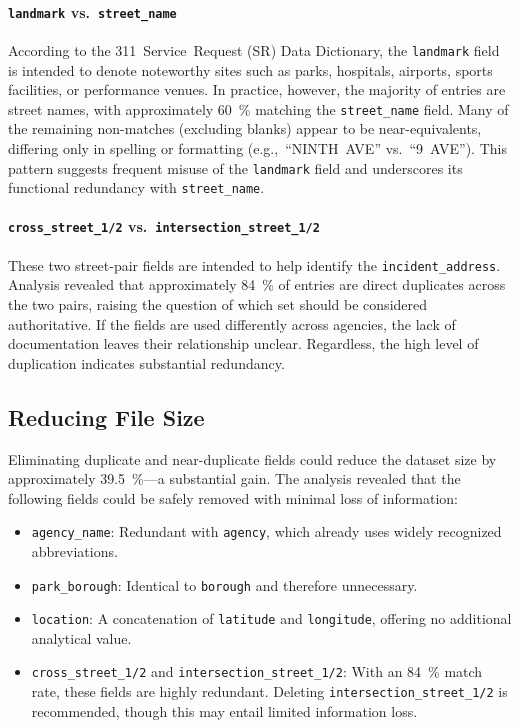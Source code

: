 \documentclass[linenumber]{jdsart}
\begin{document}
\paragraph{\texttt{landmark} vs.~\texttt{street\_name}}  
According to the 311~Service~Request (\textsc{SR}) Data Dictionary, 
the \texttt{landmark} field is intended to denote noteworthy sites such as 
parks, hospitals, airports, sports facilities, or performance venues. 
In practice, however, the majority of entries are street names, with 
approximately \SI{60}{\percent} matching the \texttt{street\_name} field. 
Many of the remaining non-matches (excluding blanks) appear to be 
near-equivalents, differing only in spelling or formatting 
(e.g.,~``NINTH~AVE'' vs.~``9~AVE''). 
This pattern suggests frequent misuse of the \texttt{landmark} field and 
underscores its functional redundancy with \texttt{street\_name}. 

\paragraph{\texttt{cross\_street\_1/2} vs.~\texttt{intersection\_street\_1/2}}  
These two street-pair fields are intended to help identify the 
\texttt{incident\_address}. 
Analysis revealed that approximately \SI{84}{\percent} of entries are direct 
duplicates across the two pairs, raising the question of which set should be 
considered authoritative. If the fields are used differently across agencies, 
the lack of documentation leaves their relationship unclear. 
Regardless, the high level of duplication indicates substantial redundancy.  



\subsection{Reducing File Size}
\label{subsec:filesize}
Eliminating duplicate and near-duplicate fields could reduce the 
dataset size by approximately \SI{39.5}{\percent}—a substantial gain. 
The analysis revealed that the following fields could be safely 
removed with minimal loss of information:

\begin{itemize}[left=1.5em]
  \item \texttt{agency\_name}: Redundant with \texttt{agency}, which already uses 
        widely recognized abbreviations.  
  \item \texttt{park\_borough}: Identical to \texttt{borough} and therefore unnecessary.  
  \item \texttt{location}: A concatenation of \texttt{latitude} and \texttt{longitude}, 
        offering no additional analytical value.  
  \item \texttt{cross\_street\_1/2} and \texttt{intersection\_street\_1/2}: 
        With an \SI{84}{\percent} match rate, these fields are highly redundant. 
        Deleting \texttt{intersection\_street\_1/2} is recommended, though this may 
        entail limited information loss.  
\end{itemize}
\end{document}
